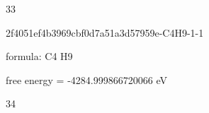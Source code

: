 \documentclass{article}
\begin{document}
33

\vspace{1cm}


2f4051ef4b3969cbf0d7a51a3d57959e-C4H9-1-1



formula: C4 H9



free energy = -4284.999866720066 eV

34
\end{document}
